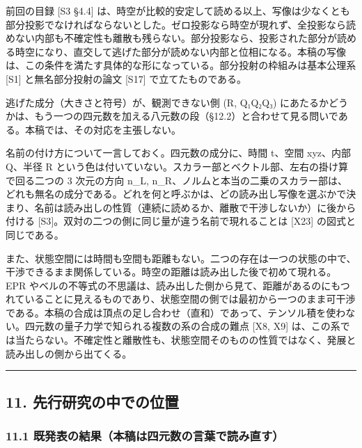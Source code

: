 \documentclass[
  a4paper,
]{ltjsarticle}
\begin{document}
前回の目録 {[}S3 §4.4{]}
は、時空が比較的安定して読める以上、写像は少なくとも部分投影でなければならないとした。ゼロ投影なら時空が現れず、全投影なら読めない内部も不確定性も離散も残らない。部分投影なら、投影された部分が読める時空になり、直交して逃げた部分が読めない内部と位相になる。本稿の写像は、この条件を満たす具体的な形になっている。部分投射の枠組みは基本公理系
{[}S1{]} と無名部分投射の論文 {[}S17{]} で立てたものである。

逃げた成分（大きさと符号）が、観測できない側 (R, Q₁Q₂Q₃)
にあたるかどうかは、もう一つの四元数を加える八元数の段（§12.2）と合わせて見る問いである。本稿では、その対応を主張しない。

名前の付け方について一言しておく。四元数の成分に、時間 t、空間 xyz、内部
Q、半径 R
という色は付いていない。スカラー部とベクトル部、左右の掛け算で回る二つの
3 次元の方向 n\_L,
n\_R、ノルムと本当の二乗のスカラー部は、どれも無名の成分である。どれを何と呼ぶかは、どの読み出し写像を選ぶかで決まり、名前は読み出しの性質（連続に読めるか、離散で干渉しないか）に後から付ける
{[}S3{]}。双対の二つの側に同じ量が違う名前で現れることは {[}X23{]}
の図式と同じである。

また、状態空間には時間も空間も距離もない。二つの存在は一つの状態の中で、干渉できるまま関係している。時空の距離は読み出した後で初めて現れる。EPR
やベルの不等式の不思議は、読み出した側から見て、距離があるのにもつれていることに見えるものであり、状態空間の側では最初から一つのまま可干渉である。本稿の合成は頂点の足し合わせ（直和）であって、テンソル積を使わない。四元数の量子力学で知られる複数の系の合成の難点
{[}X8, X9{]}
は、この系では当たらない。不確定性と離散性も、状態空間そのものの性質ではなく、発展と読み出しの側から出てくる。

\begin{center}\rule{0.5\linewidth}{0.5pt}\end{center}

\subsection{11.
先行研究の中での位置}\label{ux5148ux884cux7814ux7a76ux306eux4e2dux3067ux306eux4f4dux7f6e}

\subsubsection{11.1
既発表の結果（本稿は四元数の言葉で読み直す）}\label{ux65e2ux767aux8868ux306eux7d50ux679cux672cux7a3fux306fux56dbux5143ux6570ux306eux8a00ux8449ux3067ux8aadux307fux76f4ux3059}
\end{document}
